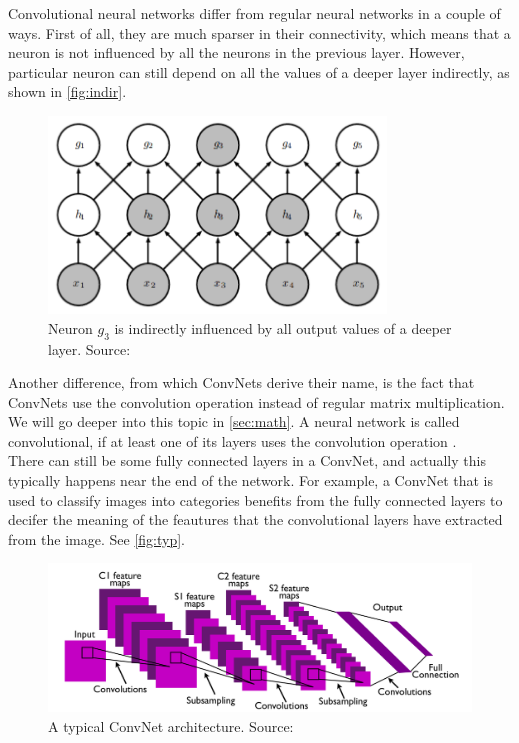 Convolutional neural networks differ from regular neural networks in a couple of ways. First of all, they are much sparser in their connectivity, which means that a neuron is not influenced by all the neurons in the previous layer. However, particular neuron can still depend on all the values of a deeper layer indirectly, as shown in \autoref{fig:indir}.\\

\begin{figure}
    \centering
    \includegraphics[width=0.8\textwidth]{images/indir.png}
    \caption{Neuron $g_3$ is indirectly influenced by all output values of a deeper layer. Source: \cite{dl-book}}
    \label{fig:indir}
\end{figure}

Another difference, from which ConvNets derive their name, is the fact that ConvNets use the convolution operation instead of regular matrix multiplication. We will go deeper into this topic in \autoref{sec:math}. A neural network is called convolutional, if at least one of its layers uses the convolution operation \cite[Ch. 9]{dl-book}.\\

There can still be some fully connected layers in a ConvNet, and actually this typically happens near the end of the network. For example, a ConvNet that is used to classify images into categories benefits from the fully connected layers to decifer the meaning of the feautures that the convolutional layers have extracted from the image. See \autoref{fig:typ}.

\begin{figure}
    \centering
    \includegraphics[width=\textwidth]{images/typicalConvNet.png}
    \caption{A typical ConvNet architecture. Source: \cite{convnet}}
    \label{fig:typ}
\end{figure}







